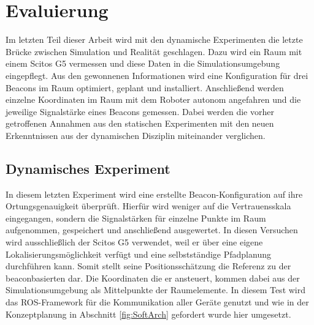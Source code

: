 \chapter{Evaluierung}
Im letzten Teil dieser Arbeit wird mit den dynamische Experimenten die letzte Brücke zwischen Simulation und Realität geschlagen. Dazu wird ein Raum mit einem Scitos G5 vermessen und diese Daten in die Simulationsumgebung eingepflegt. Aus den gewonnenen Informationen wird eine Konfiguration für drei Beacons im Raum optimiert, geplant und installiert. Anschließend werden einzelne Koordinaten im Raum mit dem Roboter autonom angefahren und die jeweilige Signalstärke eines Beacons gemessen. Dabei werden die vorher getroffenen Annahmen aus den statischen Experimenten mit den neuen Erkenntnissen aus der dynamischen Disziplin miteinander verglichen. 
\section{Dynamisches Experiment}
In diesem letzten Experiment wird eine erstellte Beacon-Konfiguration auf ihre Ortungsgenauigkeit überprüft. Hierfür wird weniger auf die Vertrauensskala eingegangen, sondern die Signalstärken für einzelne Punkte im Raum aufgenommen, gespeichert und anschließend ausgewertet. In diesen Versuchen wird ausschließlich der Scitos G5 verwendet, weil er über eine eigene Lokalisierungsmöglichkeit verfügt und eine selbstständige Pfadplanung durchführen kann. Somit stellt seine Positionsschätzung die Referenz zu der beaconbasierten dar. Die Koordinaten die er ansteuert, kommen dabei aus der Simulationsumgebung als Mittelpunkte der Raumelemente. In diesem Test wird das ROS-Framework für die Kommunikation aller Geräte genutzt und wie in der Konzeptplanung in Abschnitt \ref{fig:SoftArch} gefordert wurde hier umgesetzt.
